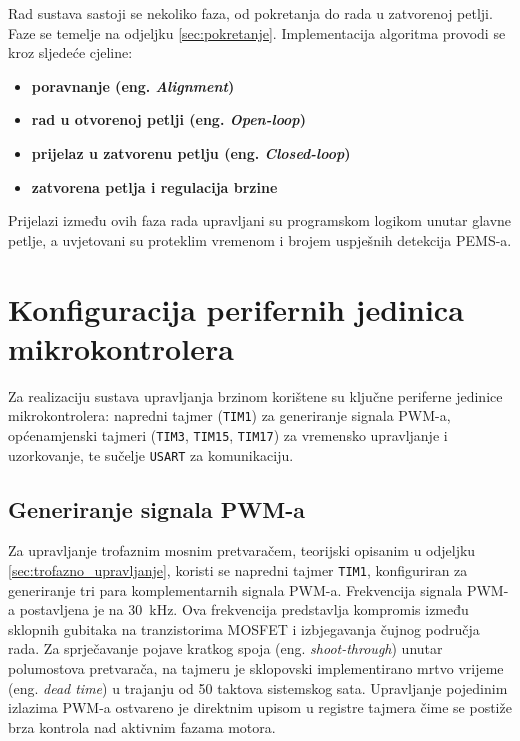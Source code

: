 \documentclass[diplomskirad]{fer}
\begin{document}
Rad sustava sastoji se nekoliko faza, od pokretanja do rada u zatvorenoj
petlji. Faze se temelje na odjeljku \ref{sec:pokretanje}. Implementacija
algoritma provodi se kroz sljedeće cjeline:
\begin{itemize}
	\item \textbf{poravnanje (eng. \textit{Alignment})}
	\item \textbf{rad u otvorenoj petlji (eng. \textit{Open-loop})}
	\item \textbf{prijelaz u zatvorenu petlju (eng. \textit{Closed-loop})}
	\item \textbf{zatvorena petlja i regulacija brzine}
\end{itemize}
Prijelazi između ovih faza rada upravljani su programskom logikom unutar glavne
petlje, a uvjetovani su proteklim vremenom i brojem uspješnih detekcija PEMS-a.


\section{Konfiguracija perifernih jedinica mikrokontrolera}
\label{sec:konfiguracija_periferije}

Za realizaciju sustava upravljanja brzinom korištene su ključne periferne
jedinice mikrokontrolera: napredni tajmer (\texttt{TIM1}) za generiranje
signala PWM-a, općenamjenski tajmeri (\texttt{TIM3}, \texttt{TIM15},
\texttt{TIM17}) za vremensko upravljanje i uzorkovanje, te sučelje
\texttt{USART} za komunikaciju.

\subsection{Generiranje signala PWM-a}
\label{ssec:generiranje_pwm}

Za upravljanje trofaznim mosnim pretvaračem, teorijski opisanim u odjeljku
\ref{sec:trofazno_upravljanje}, koristi se napredni tajmer \texttt{TIM1},
konfiguriran za generiranje tri para komplementarnih signala PWM-a. Frekvencija
signala PWM-a postavljena je na \SI{30}{\kilo\hertz}. Ova frekvencija
predstavlja kompromis između sklopnih gubitaka na tranzistorima MOSFET i
izbjegavanja čujnog područja rada. Za sprječavanje pojave kratkog spoja (eng.
\textit{shoot-through}) unutar polumostova pretvarača, na tajmeru je sklopovski
implementirano mrtvo vrijeme (eng. \textit{dead time}) u trajanju od 50 taktova
sistemskog sata. Upravljanje pojedinim izlazima PWM-a ostvareno je direktnim
upisom u registre tajmera čime se postiže brza kontrola nad aktivnim fazama
motora.
\end{document}
